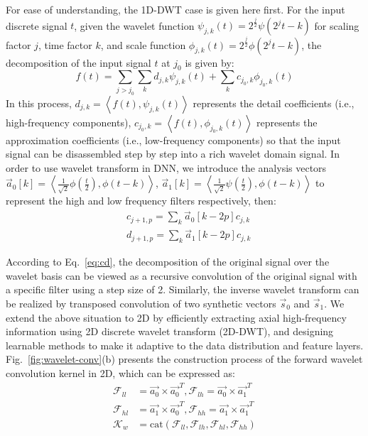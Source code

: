 \documentclass[10pt,twocolumn,letterpaper]{article}
\begin{document}
For ease of understanding, the 1D-DWT case is given here first. For the input discrete signal $t$, given the wavelet function $\psi_{j, k}(t)=2^{\frac{j}{2}}\psi(2^{j}t -k)$ for scaling factor $j$, time factor $k$, and scale function $\phi_{j, k}(t)=2^{\frac{j}{2}}\phi( 2^{j}t -k)$, the decomposition of the input signal $t$ at $j_0$ is given by:
\begin{equation}
   f(t)=\sum_{j>j_{0}} \sum_k d_{j, k} \psi_{j, k}(t) + \sum_k c_{j_0,k}\phi_{j_0,k}\left(t\right)
\end{equation}
In this process, $d_{j,k}=\left\langle f(t), \psi_{j, k}(t)\right\rangle$ represents the detail coefficients (i.e., high-frequency components),
$c_{j_0,k}=\left\langle f(t), \phi_{j_0, k}(t)\right\rangle$ represents the approximation coefficients (i.e., low-frequency components) so that the input signal can be disassembled step by step into a rich wavelet domain signal.
In order to use wavelet transform in DNN, we introduce the analysis vectors $\vec{a}_0[k]=\left\langle\frac{1}{\sqrt{2}} \phi(\frac{t}{2}), \phi(t-k)\right\rangle$, $\vec{a}_1[k]=\left\langle\frac{1}{\sqrt{2}} \psi(\frac{t}{2}), \phi(t-k)\right\rangle$ to represent the high and low frequency filters respectively, 
then:
\begin{equation}
   \begin{aligned}
      &c_{j+1,p}=\sum_k \vec{a}_0[k-2p]c_{j,k}\\
      &d_{j+1,p}=\sum_k \vec{a}_1[k-2p]c_{j,k}
   \end{aligned}
   \label{eq:cd}
\end{equation}
\par According to Eq.~\ref{eq:cd}, the decomposition of the original signal over the wavelet basis can be viewed as a recursive convolution of the original signal with a specific filter using a step size of 2. Similarly, the inverse wavelet transform can be realized by transposed convolution of two synthetic vectors $\vec{s}_0$ and $\vec{s}_{1}$. 
We extend the above situation to 2D by efficiently extracting axial high-frequency information using 2D discrete wavelet transform (2D-DWT), and designing learnable methods to make it adaptive to the data distribution and feature layers. 
Fig.~\ref{fig:wavelet-conv}(b) presents the construction process of the forward wavelet convolution kernel in 2D, which can be expressed as:
\begin{equation}
   \begin{aligned}
   \mathcal{F}_{ll} &= \vec{a_0} \times \vec{a_0}^{ T}, \mathcal{F}_{lh} = \vec{a_0} \times\vec{a_1}^{ T}\\
   \mathcal{F}_{hl} &= \vec{a_1} \times \vec{a_0}^{ T}, \mathcal{F}_{hh} = \vec{a_1} \times \vec{a_1}^{ T}\\
   \mathcal{K}_{w} &= \text{cat}\left(\mathcal{F}_{ll}, \mathcal{F}_{lh},\mathcal{F}_{hl},\mathcal{F}_{hh}\right)
   \end{aligned}
\end{equation}
\end{document}
